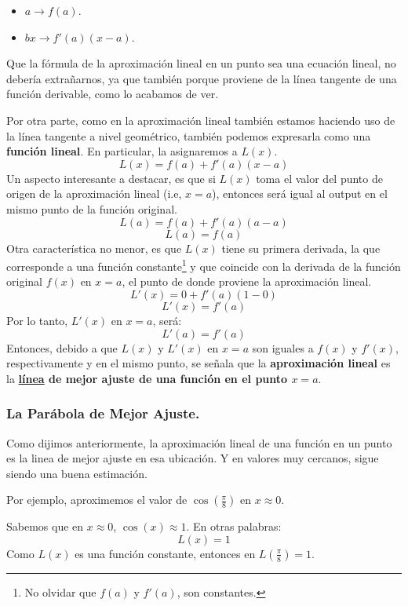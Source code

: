 \documentclass[12pt]{article}
\begin{document}
\begin{itemize}
\item $a \rightarrow f(a)$.
\item $bx \rightarrow f'(a)(x - a)$.
\end{itemize}

Que la fórmula de la aproximación lineal en un punto sea una ecuación lineal, no debería extrañarnos, ya que también porque proviene de la línea tangente de una función derivable, como lo acabamos de ver.

\newpage

Por otra parte, como en la aproximación lineal también estamos haciendo uso de la línea tangente a nivel geométrico, también podemos expresarla como una \textbf{función lineal}. En particular, la asignaremos a $L(x)$.
\[L(x) = f(a) + f'(a)(x - a)\]
Un aspecto interesante a destacar, es que si $L(x)$ toma el valor del punto de origen de la aproximación lineal (i.e, $x = a$), entonces será igual al output en el mismo punto de la función original.
\[L(a) = f(a) + f'(a)(a - a)\]
\[L(a) = f(a)\]
Otra característica no menor, es que $L(x)$ tiene su primera derivada, la que corresponde a una función constante\footnote{No olvidar que $f(a)$ y $f'(a)$, son constantes.} y que coincide con la derivada de la función original $f(x)$ en $x = a$, el punto de donde proviene la aproximación lineal.
\[L'(x) = 0 + f'(a)(1 - 0)\]
\[L'(x) = f'(a)\]
Por lo tanto, $L'(x)$ en $x = a$, será:
\[L'(a) = f'(a)\]
Entonces, debido a que $L(x)$ y $L'(x)$ en $x = a$ son iguales a $f(x)$ y $f'(x)$, respectivamente y en el mismo punto, se señala que la \textbf{aproximación lineal} es la \textbf{\underline{línea} de mejor ajuste de una función en el punto $x = a$}.


\subsubsection{La Parábola de Mejor Ajuste.}

Como dijimos anteriormente, la aproximación lineal de una función en un punto es la linea de mejor ajuste en esa ubicación. Y en valores muy cercanos, sigue siendo una buena estimación.

Por ejemplo, aproximemos el valor de $\cos\left(\frac{\pi}{8}\right)$ en $x \approx 0$.

Sabemos que en $x \approx 0$, $\cos(x) \approx 1$. En otras palabras:
\[L(x) = 1\]
Como $L(x)$ es una función constante, entonces en $L\left(\frac{\pi}{8}\right) = 1$.

\newpage
\end{document}
